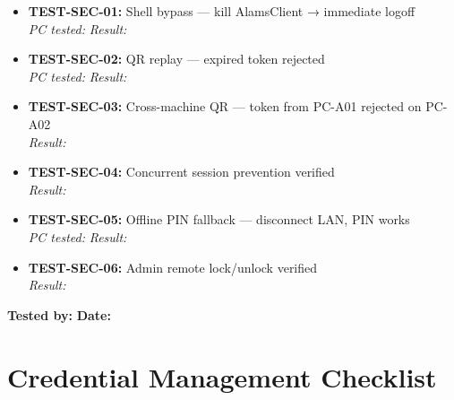 \begin{itemize}[label={\faSquare[regular]}, itemsep=6pt]
  \item[$\square$] \textbf{TEST-SEC-01:} Shell bypass — kill AlamsClient → immediate logoff \\
    \textit{PC tested:} \underline{\hspace{3cm}} \quad \textit{Result:} \underline{\hspace{5cm}}
  \item[$\square$] \textbf{TEST-SEC-02:} QR replay — expired token rejected \\
    \textit{PC tested:} \underline{\hspace{3cm}} \quad \textit{Result:} \underline{\hspace{5cm}}
  \item[$\square$] \textbf{TEST-SEC-03:} Cross-machine QR — token from PC-A01 rejected on PC-A02 \\
    \textit{Result:} \underline{\hspace{8cm}}
  \item[$\square$] \textbf{TEST-SEC-04:} Concurrent session prevention verified \\
    \textit{Result:} \underline{\hspace{8cm}}
  \item[$\square$] \textbf{TEST-SEC-05:} Offline PIN fallback — disconnect LAN, PIN works \\
    \textit{PC tested:} \underline{\hspace{3cm}} \quad \textit{Result:} \underline{\hspace{5cm}}
  \item[$\square$] \textbf{TEST-SEC-06:} Admin remote lock/unlock verified \\
    \textit{Result:} \underline{\hspace{8cm}}
\end{itemize}

\textbf{Tested by:} \underline{\hspace{6cm}} \quad \textbf{Date:} \underline{\hspace{3cm}}

\section{Credential Management Checklist}

